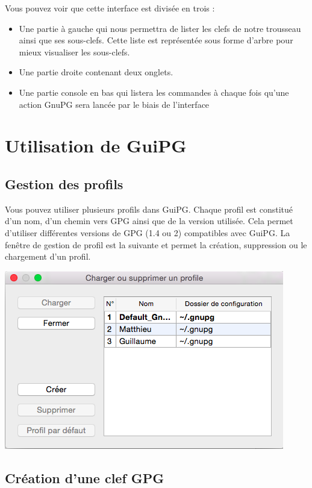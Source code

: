 \documentclass[a4paper,11pt,french]{article}
\begin{document}
Vous pouvez voir que cette interface est divisée en trois : 
\begin{itemize}
\item Une partie à gauche qui nous permettra de lister les clefs de notre trousseau ainsi que ses sous-clefs. Cette liste est représentée sous forme d'arbre pour mieux visualiser les sous-clefs.
\item Une partie droite contenant deux onglets.
\item Une partie console en bas qui listera les commandes à chaque fois qu'une action GnuPG sera lancée par le biais de l'interface
\end{itemize}

\section{Utilisation de GuiPG}

\subsection{Gestion des profils}

Vous pouvez utiliser plusieurs profils dans GuiPG. Chaque profil est constitué d'un nom, d'un chemin vers GPG ainsi que de la version utilisée. Cela permet d'utiliser différentes versions de GPG (1.4 ou 2) compatibles avec GuiPG. La fenêtre de gestion de profil est la suivante et permet la création, suppression ou le chargement d'un
profil. \bigbreak

\includegraphics[scale=0.5]{profil.png}


\subsection{Création d'une clef GPG}
\end{document}
